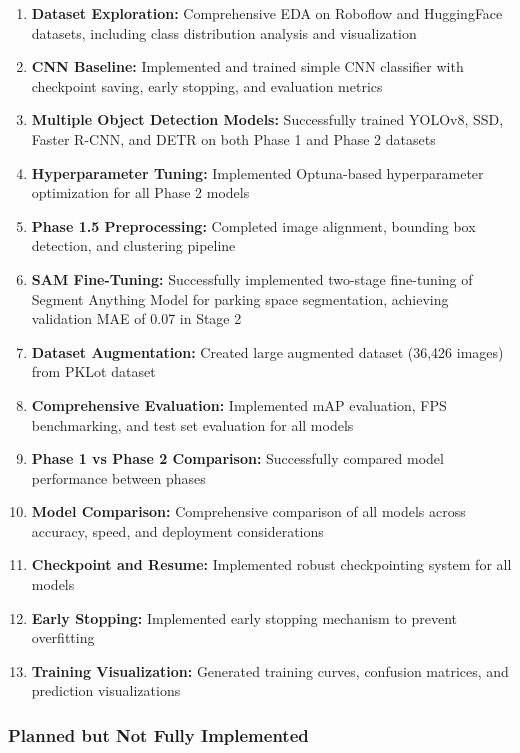 \documentclass[12pt,a4paper]{article}
\begin{document}
\begin{enumerate}
    \item \textbf{Dataset Exploration:} Comprehensive EDA on Roboflow and HuggingFace datasets, including class distribution analysis and visualization
    \item \textbf{CNN Baseline:} Implemented and trained simple CNN classifier with checkpoint saving, early stopping, and evaluation metrics
    \item \textbf{Multiple Object Detection Models:} Successfully trained YOLOv8, SSD, Faster R-CNN, and DETR on both Phase 1 and Phase 2 datasets
    \item \textbf{Hyperparameter Tuning:} Implemented Optuna-based hyperparameter optimization for all Phase 2 models
    \item \textbf{Phase 1.5 Preprocessing:} Completed image alignment, bounding box detection, and clustering pipeline
    \item \textbf{SAM Fine-Tuning:} Successfully implemented two-stage fine-tuning of Segment Anything Model for parking space segmentation, achieving validation MAE of 0.07 in Stage 2
    \item \textbf{Dataset Augmentation:} Created large augmented dataset (36,426 images) from PKLot dataset
    \item \textbf{Comprehensive Evaluation:} Implemented mAP evaluation, FPS benchmarking, and test set evaluation for all models
    \item \textbf{Phase 1 vs Phase 2 Comparison:} Successfully compared model performance between phases
    \item \textbf{Model Comparison:} Comprehensive comparison of all models across accuracy, speed, and deployment considerations
    \item \textbf{Checkpoint and Resume:} Implemented robust checkpointing system for all models
    \item \textbf{Early Stopping:} Implemented early stopping mechanism to prevent overfitting
    \item \textbf{Training Visualization:} Generated training curves, confusion matrices, and prediction visualizations
\end{enumerate}

\subsubsection{Planned but Not Fully Implemented}
\end{document}
